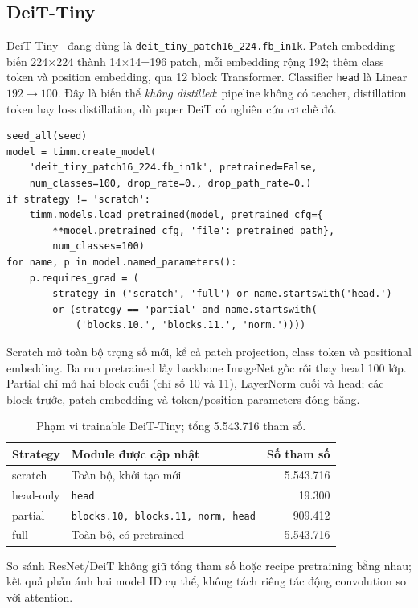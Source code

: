 \documentclass[11pt,a4paper]{article}
\begin{document}
\subsection{DeiT-Tiny}
DeiT-Tiny~\cite{deit} đang dùng là \texttt{deit\_tiny\_patch16\_224.fb\_in1k}. Patch embedding biến 224$\times$224 thành 14$\times$14=196 patch, mỗi embedding rộng 192; thêm class token và position embedding, qua 12 block Transformer. Classifier \texttt{head} là Linear$192\to 100$. Đây là biến thể \emph{không distilled}: pipeline không có teacher, distillation token hay loss distillation, dù paper DeiT có nghiên cứu cơ chế đó.
\begin{lstlisting}
seed_all(seed)
model = timm.create_model(
    'deit_tiny_patch16_224.fb_in1k', pretrained=False,
    num_classes=100, drop_rate=0., drop_path_rate=0.)
if strategy != 'scratch':
    timm.models.load_pretrained(model, pretrained_cfg={
        **model.pretrained_cfg, 'file': pretrained_path},
        num_classes=100)
for name, p in model.named_parameters():
    p.requires_grad = (
        strategy in ('scratch', 'full') or name.startswith('head.')
        or (strategy == 'partial' and name.startswith(
            ('blocks.10.', 'blocks.11.', 'norm.'))))
\end{lstlisting}
Scratch mở toàn bộ trọng số mới, kể cả patch projection, class token và positional embedding. Ba run pretrained lấy backbone ImageNet gốc rồi thay head 100 lớp. Partial chỉ mở hai block cuối (chỉ số 10 và 11), LayerNorm cuối và head; các block trước, patch embedding và token/position parameters đóng băng.

\begin{table}[htbp]\centering\small\caption{Phạm vi trainable DeiT-Tiny; tổng 5.543.716 tham số.}
\begin{tabular}{llr}\toprule Strategy & Module được cập nhật & Số tham số\\\midrule
scratch & Toàn bộ, khởi tạo mới &5.543.716\\
head-only & \texttt{head} &19.300\\
partial & \texttt{blocks.10, blocks.11, norm, head} &909.412\\
full & Toàn bộ, có pretrained &5.543.716\\\bottomrule\end{tabular}\end{table}
So sánh ResNet/DeiT không giữ tổng tham số hoặc recipe pretraining bằng nhau; kết quả phản ánh hai model ID cụ thể, không tách riêng tác động convolution so với attention.
\clearpage
\end{document}
